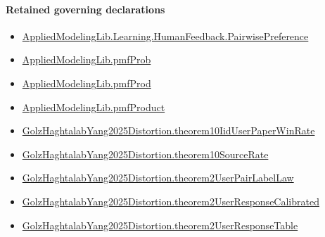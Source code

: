 \documentclass[10pt]{article}
\begin{document}
\paragraph{Retained governing declarations}
\begin{itemize}\raggedright
\item \hyperlink{library-prerequisite-7e2db20cf087d9ba}{Applied\allowbreak{}Modeling\allowbreak{}Lib.\allowbreak{}Learning.\allowbreak{}Human\allowbreak{}Feedback.\allowbreak{}Pairwise\allowbreak{}Preference}
\item \hyperlink{governing-declaration-9c38d53b9d664221}{Applied\allowbreak{}Modeling\allowbreak{}Lib.\allowbreak{}pmf\allowbreak{}Prob}
\item \hyperlink{library-prerequisite-de8e2a8bfe221a38}{Applied\allowbreak{}Modeling\allowbreak{}Lib.\allowbreak{}pmf\allowbreak{}Prod}
\item \hyperlink{governing-declaration-5ac12d0a52b69068}{Applied\allowbreak{}Modeling\allowbreak{}Lib.\allowbreak{}pmf\allowbreak{}Product}
\item \hyperlink{governing-declaration-a1441da0ef6b2fa2}{Golz\allowbreak{}Haghtalab\allowbreak{}Yang2025\allowbreak{}Distortion.\allowbreak{}theorem10\allowbreak{}Iid\allowbreak{}User\allowbreak{}Paper\allowbreak{}Win\allowbreak{}Rate}
\item \hyperlink{governing-declaration-aaf6dc2063f9888f}{Golz\allowbreak{}Haghtalab\allowbreak{}Yang2025\allowbreak{}Distortion.\allowbreak{}theorem10\allowbreak{}Source\allowbreak{}Rate}
\item \hyperlink{governing-declaration-98c3ee9a11a59ef9}{Golz\allowbreak{}Haghtalab\allowbreak{}Yang2025\allowbreak{}Distortion.\allowbreak{}theorem2\allowbreak{}User\allowbreak{}Pair\allowbreak{}Label\allowbreak{}Law}
\item \hyperlink{governing-declaration-080b9388e51a6018}{Golz\allowbreak{}Haghtalab\allowbreak{}Yang2025\allowbreak{}Distortion.\allowbreak{}theorem2\allowbreak{}User\allowbreak{}Response\allowbreak{}Calibrated}
\item \hyperlink{governing-declaration-c5d0273cbd7ddcc9}{Golz\allowbreak{}Haghtalab\allowbreak{}Yang2025\allowbreak{}Distortion.\allowbreak{}theorem2\allowbreak{}User\allowbreak{}Response\allowbreak{}Table}
\end{itemize}
\end{document}
